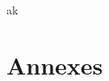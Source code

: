 \documentclass[12pt,a4paper,oneside,oldfontcommands,xindy]{memoir}
\begin{document}
  
  
  
  
  
  
  \renewcommand{\appendixtocname}{Annexes}
  \renewcommand{\appendixname}{Annexe}
  \renewcommand{\appendixpagename}{Annexes}
  
  \appendix
ak	  \part*{Annexes}
  \thispagestyle{part}
  
\end{document}
